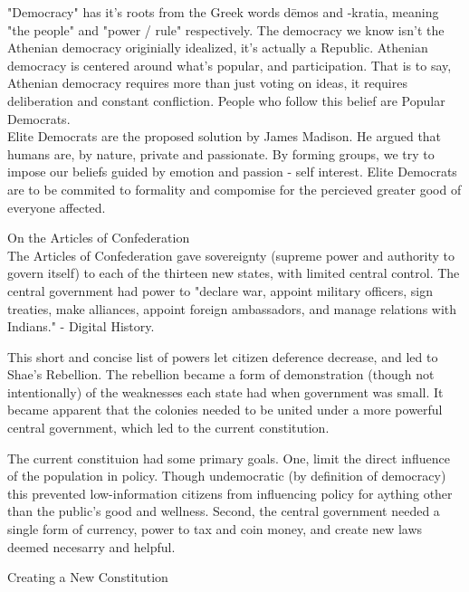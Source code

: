 \documentclass{article}
\begin{document}
\indent
"Democracy" has it's roots from the Greek words d\={e}mos and -kratia, meaning "the people" and "power / rule" respectively. The democracy we know isn't the Athenian democracy originially idealized, it's actually a Republic. Athenian democracy is centered around what's popular, and participation. That is to say, Athenian democracy requires more than just voting on ideas, it requires deliberation and constant confliction. People who follow this belief are Popular Democrats.\\

Elite Democrats are the proposed solution by James Madison. He argued that humans are, by nature, private and passionate. By forming groups, we try to impose our beliefs guided by emotion and passion - self interest. Elite Democrats are to be commited to formality and compomise for the percieved greater good of everyone affected.

\noindent
\Large
On the Articles of Confederation\\
\normalsize
\indent
The Articles of Confederation gave sovereignty (supreme power and authority to govern itself) to each of the thirteen new states, with limited central control. The central government had power to "declare war, appoint military officers, sign treaties, make alliances, appoint foreign ambassadors, and manage relations with Indians." - Digital History.

This short and concise list of powers let citizen deference decrease, and led to Shae's Rebellion. The rebellion became a form of demonstration (though not intentionally) of the weaknesses each state had when government was small. It became apparent that the colonies needed to be united under a more powerful central government, which led to the current constitution.

The current constituion had some primary goals. One, limit the direct influence of the population in policy. Though undemocratic (by definition of democracy) this prevented low-information citizens from influencing policy for aything other than the public's good and wellness. Second, the central government needed a single form of currency, power to tax and coin money, and create new laws deemed necesarry and helpful.

\noindent
\Large
Creating a New Constitution\\
\normalsize
\indent
\end{document}
